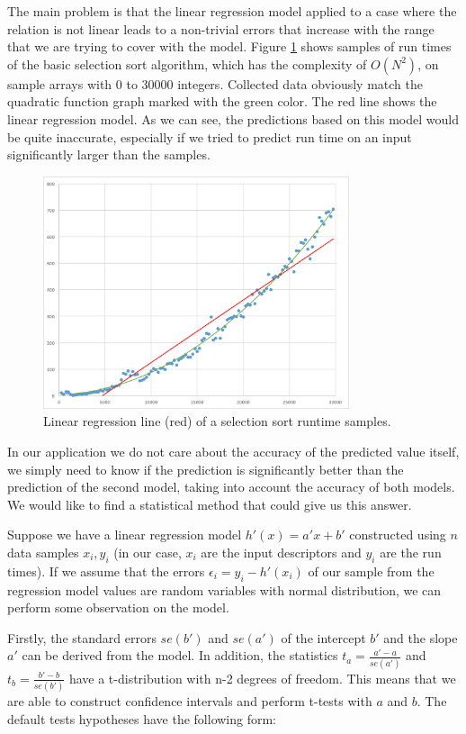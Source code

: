 The main problem is that the linear regression model applied to a case where the relation is not linear leads to a non-trivial errors that increase with the range that we are trying to cover with the model. Figure \ref{fig:selection_sort_linear_trendline} shows samples of run times of the basic selection sort algorithm, which has the complexity of \(O(N^2)\), on sample arrays with 0 to 30000 integers. Collected data obviously match the quadratic function graph marked with the green color. The red line shows the linear regression model. As we can see, the predictions based on this model would be quite inaccurate, especially if we tried to predict run time on an input significantly larger than the samples.

\begin{figure}[h!]
	\centerline{\mbox{\includegraphics[width=90mm]{./img/selection_sort_linear_trendline.png}}}
	\caption{Linear regression line (red) of a selection sort runtime samples.}
	\label{fig:selection_sort_linear_trendline}
\end{figure}

In our application we do not care about the accuracy of the predicted value itself, we simply need to know if the prediction is significantly better than the prediction of the second model, taking into account the accuracy of both models. We would like to find a statistical method that could give us this answer.

Suppose we have a linear regression model \(h'(x) = a' x + b'\) constructed using \(n\) data samples \(x_i, y_i\) (in our case, \(x_i\) are the input descriptors and \(y_i\) are the run times). If we assume that the errors $\epsilon_i = y_i - h'(x_i)$ of our sample from the regression model values are random variables with normal distribution, we can perform some observation on the model.

Firstly, the standard errors $se(b')$ and $se(a')$ of the intercept $b'$ and the slope $a'$ can be derived from the model. In addition, the statistics $t_a = \frac{a' - a}{se(a')}$ and $t_b = \frac{b' - b}{se(b')}$ have a t-distribution with n-2 degrees of freedom. This means that we are able to construct confidence intervals and perform t-tests with $a$ and $b$. The default tests hypotheses have the following form:

